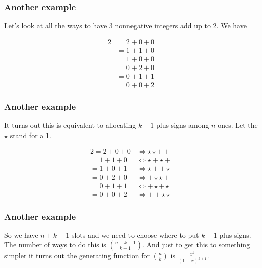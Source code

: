\documentclass{beamer}
\begin{document}
\begin{frame}
    \frametitle{Another example}

    Let's look at all the ways to have 3 nonnegative integers add up to 2. We have 

    \begin{align*}
        2 &= 2 + 0 + 0 \\
        &= 1 + 1 + 0 \\
        &= 1 + 0 + 0 \\
        &= 0 + 2 + 0 \\
        &= 0 + 1 + 1 \\
        &= 0 + 0 + 2
    \end{align*}

\end{frame}

\begin{frame}
    \frametitle{Another example}

    It turns out this is equivalent to allocating $k-1$ plus signs among $n$ ones. Let the $\star$ stand for a 1.

    \begin{align*}
        2 = 2 + 0 + 0 &\Leftrightarrow \star \star + +\\
        = 1 + 1 + 0 &\Leftrightarrow \star + \star +\\
        = 1 + 0 + 1 &\Leftrightarrow \star + + \star\\
        = 0 + 2 + 0 &\Leftrightarrow + \star \star + \\
        = 0 + 1 + 1 &\Leftrightarrow + \star + \star \\
        = 0 + 0 + 2 &\Leftrightarrow + + \star \star
    \end{align*}

\end{frame}

\begin{frame}
    \frametitle{Another example}

    So we have $n + k - 1$ slots and we need to choose where to put $k-1$ plus signs. The number of ways to do this is ${n + k - 1 \choose k - 1}$. \pause
    \quad
    \newline
    \newline
    And just to get this to something simpler it turns out the generating function for ${n \choose k}$ is $\frac{x ^ k}{(1 - x)^{k + 1}}$.

\end{frame}
\end{document}
